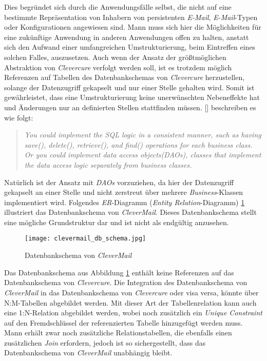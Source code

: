 \newline
\newline
Dies begründet sich durch die Anwendungsfälle selbst, die nicht auf eine bestimmte Repräsentation von Inhabern von persistenten \emph{E-Mail}, \emph{E-Mail}-Typen oder Konfigurationen angewiesen sind. Mann muss sich hier die Möglichkeiten für eine zukünftige Anwendung in anderen Anwendungen offen zu halten, anstatt sich den Aufwand einer umfangreichen Umstrukturierung, beim Eintreffen eines solchen Falles, auszusetzen. 
\newline
\newline
Auch wenn der Ansatz der größtmöglichen Abstraktion von \emph{Clevercure} verfolgt werden soll, ist es trotzdem möglich Referenzen auf Tabellen des Datenbankschemas von \emph{Clevercure} herzustellen, solange der Datenzugriff gekapselt und nur einer Stelle gehalten wird. Somit ist gewährleistet, dass eine Umstrukturierung keine unerwünschten Nebeneffekte hat und Änderungen nur an definierten Stellen stattfinden müssen. [\cite[66]{refactoreDatabase}] beschreiben es wie folgt:
\begin{quote}
\emph{You could implement the SQL logic in a consistent manner, such as having save(), delete(), retrieve(), and find() operations for each business class. Or you could implement data access objects(DAOs), classes that implement the data access logic separately from business classes.}
\end{quote}
Natürlich ist der Ansatz mit \emph{DAOs} vorzuziehen, da hier der Datenzugriff gekapselt an einer Stelle und nicht zerstreut über mehrere \emph{Business}-Klassen implementiert wird.
\newpage
Folgendes \emph{ER}-Diagramm (\emph{Entity Relation}-Diagramm) \ref{fig:clevermail-db-schema} illustriert das Datenbankschema von \emph{CleverMail}. Dieses Datenbankschema stellt eine mögliche Grundstruktur dar und ist nicht als endgültig anzusehen.
\begin{figure}[H]
\centering
\texttt{[image: clevermail\_db\_schema.jpg]}
\caption{Datenbankschema von \emph{CleverMail}}
\label{fig:clevermail-db-schema}
\end{figure}
Das Datenbankschema aus Abbildung \ref{fig:clevermail-db-schema} enthält keine Referenzen auf das Datenbankschema von \emph{Clevercure}. Die Integration des Datenbankschema von \emph{CleverMail} in das Datenbankschema von \emph{Clevercure} oder visa versa, könnte über N:M-Tabellen abgebildet werden. Mit dieser Art der Tabellenrelation kann auch eine 1:N-Relation abgebildet werden, wobei noch zusätzlich ein \emph{Unique Constraint} auf den Fremdschlüssel der referenzierten Tabelle hinzugefügt werden muss. Mann erhält zwar noch zusätzliche Relationstabellen, die ebenfalls einen zusätzlichen \emph{Join} erfordern, jedoch ist so sichergestellt, dass das Datenbankschema von \emph{CleverMail} unabhängig bleibt.

